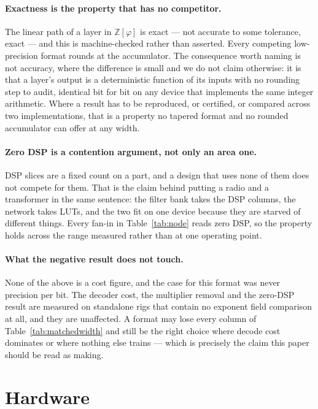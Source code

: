 \documentclass[11pt]{article}
\theoremstyle{definition}
\begin{document}
\paragraph{Exactness is the property that has no competitor.} The linear path of
a layer in $\mathbb{Z}[\varphi]$ is exact --- not accurate to some tolerance,
exact --- and this is machine-checked rather than asserted. Every competing
low-precision format rounds at the accumulator. The consequence worth naming is
not accuracy, where the difference is small and we do not claim otherwise: it is
that a layer's output is a deterministic function of its inputs with no rounding
step to audit, identical bit for bit on any device that implements the same
integer arithmetic. Where a result has to be reproduced, or certified, or
compared across two implementations, that is a property no tapered format and no
rounded accumulator can offer at any width.

\paragraph{Zero DSP is a contention argument, not only an area one.} DSP slices
are a fixed count on a part, and a design that uses none of them does not compete
for them. That is the claim behind putting a radio and a transformer in the same
sentence: the filter bank takes the DSP columns, the network takes LUTs, and the
two fit on one device because they are starved of different things. Every
fan-in in Table~\ref{tab:node} reads zero DSP, so the property holds across the
range measured rather than at one operating point.

\paragraph{What the negative result does not touch.} None of the above is a
cost figure, and the case for this format was never precision per bit. The
decoder cost, the multiplier removal and the zero-DSP result are measured on
standalone rigs that contain no exponent field comparison at all, and they are
unaffected. A format may lose every column of
Table~\ref{tab:matchedwidth} and still be the right choice where decode cost
dominates or where nothing else trains --- which is precisely the claim this
paper should be read as making.

\section{Hardware}\label{sec:hardware}
\end{document}
